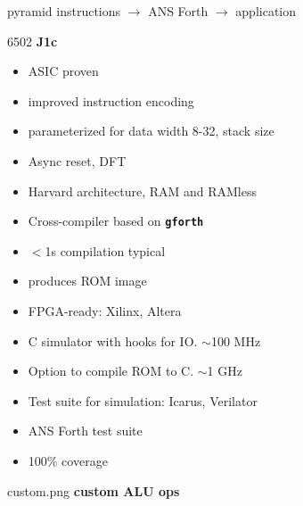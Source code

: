 \documentclass[compress,mathserif]{beamer}
\newcommand{\mach}[1]{\texttt{\textbf{#1}}}
\begin{document}
\begin{imageframe}{pyramid}
  {instructions $\rightarrow$ ANS Forth $\rightarrow$ application}
\end{imageframe}

\begin{imageframe}{6502}
  {\bf\Huge J1c}
\end{imageframe}

\begin{frame}
\begin{itemize}
   \item ASIC proven
   \item improved instruction encoding
   \item parameterized for data width 8-32, stack size
   \item Async reset, DFT
   \item Harvard architecture, RAM and RAMless
\end{itemize}
\end{frame}

\begin{frame}
\begin{itemize}
   \item Cross-compiler based on \mach{gforth}
   \item $<$1s compilation typical
   \item produces ROM image
\end{itemize}
\end{frame}

\begin{frame}
\begin{itemize}
   \item FPGA-ready: Xilinx, Altera
   \item C simulator with hooks for IO. $\sim$100 MHz
   \item Option to compile ROM to C. $\sim$1 GHz
\end{itemize}
\end{frame}

\begin{frame}
\begin{itemize}
   \item Test suite for simulation: Icarus, Verilator
   \item ANS Forth test suite
   \item 100\% coverage
\end{itemize}
\end{frame}

\begin{imageframe}{custom.png}
  {\bf\LARGE custom ALU ops}
\end{imageframe}
\end{document}
